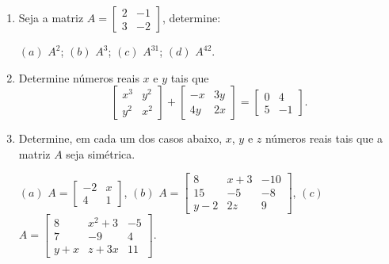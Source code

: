 \documentclass{report}
\begin{document}
\begin{Exercise}
\begin{enumerate}

\item \label{1lista7} Seja a matriz $A=\left[
\begin{array}{rr}
2 & -1 \\
3 & -2
\end{array}
\right]$, determine:

$(a)$ $A^2$; \hspace{1.5cm} $(b)$ $A^3$;\hspace{1.5cm} $(c)$
$A^{31}$; \hspace{1.5cm} $(d)$ $A^{42}$.


\item \label{1lista8} Determine números reais $x$ e $y$ tais que
$$\left[
\begin{array}{rr}
x^3 & y^2 \\
y^2 & x^2
\end{array}
\right] +  \left[
\begin{array}{rr}
-x & 3y \\
4y & 2x
\end{array}
\right] =  \left[
\begin{array}{rr}
0 & 4 \\
5 & -1
\end{array}
\right].$$


\item \label{1lista9} Determine, em cada um dos casos abaixo, $x$,
$y$ e $z$ números reais tais que a matriz $A$ seja simétrica.

$(a)$ $A=\left[
\begin{array}{cc}
-2 & x \\
4 & 1
\end{array}
\right] $, \hspace{0.5cm}  $(b)$ $A=\left[
\begin{array}{ccc}
8 & x+3 & -10 \\
15 &  -5 & -8 \\
y-2 & 2z & 9
\end{array}
\right] $,  \hspace{0.5cm} $(c)$ $A=\left[
\begin{array}{ccc}
8 & x^2+3 &  -5 \\
7 & -9 & 4 \\
y+x & z+3x & 11
\end{array}
\right].$


\end{enumerate}
\end{Exercise}
\end{document}
